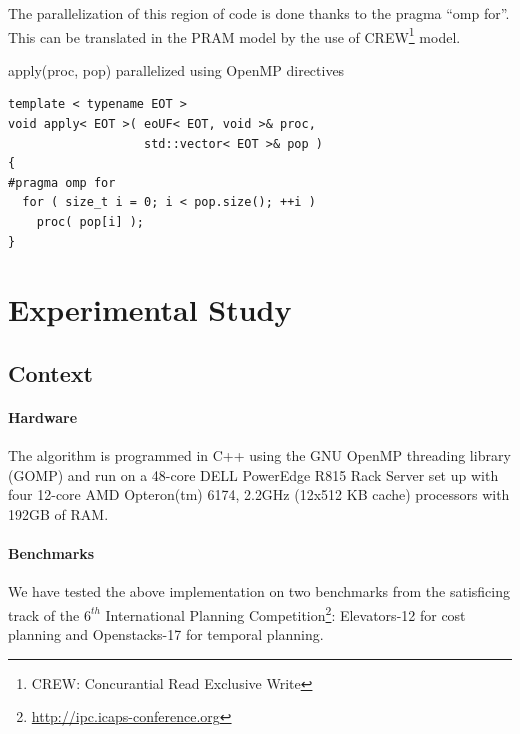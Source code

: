 \documentclass{sig-alternate}
\begin{document}

The parallelization of this region of code is done thanks to the pragma ``omp for''. This can be translated in the PRAM model by the use of CREW\footnote{CREW: Concurantial Read Exclusive Write} model.



\vspace{-0.2cm}
\begin{algorithm}[h!]
\caption{apply(proc, pop) parallelized using OpenMP directives}
\vspace{0.2cm}
\begin{verbatim}
template < typename EOT >
void apply< EOT >( eoUF< EOT, void >& proc,
                   std::vector< EOT >& pop )
{
#pragma omp for
  for ( size_t i = 0; i < pop.size(); ++i )
    proc( pop[i] );
}
\end{verbatim}
\end{algorithm}
\vspace{-0.2cm}

\section{Experimental Study}

\subsection{Context}

\paragraph{Hardware} %
The algorithm is programmed in C++ using the GNU OpenMP threading library (GOMP) and run on a 48-core DELL PowerEdge R815 Rack Server set up with four 12-core AMD Opteron(tm) 6174, 2.2GHz (12x512 KB cache) processors with 192GB of RAM.

\paragraph{Benchmarks} %
We have tested the above implementation on two benchmarks from the satisficing track of the $6^{th}$ International Planning Competition\footnote{\url{http://ipc.icaps-conference.org}}: Elevators-12 for cost planning and Openstacks-17 for temporal planning.
\end{document}
